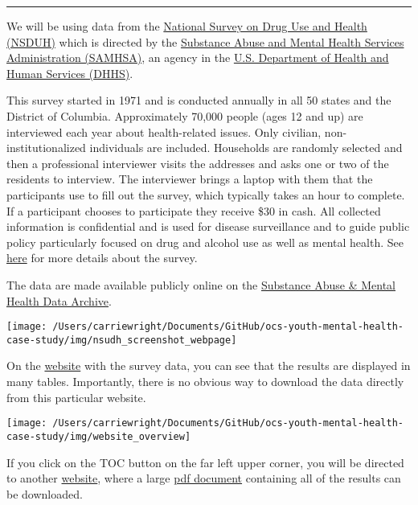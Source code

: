\documentclass[
]{article}
\begin{document}
\begin{center}\rule{0.5\linewidth}{0.5pt}\end{center}

We will be using data from the
\href{https://nsduhweb.rti.org/respweb/homepage.cfm}{National Survey on
Drug Use and Health (NSDUH)} which is directed by the
\href{https://www.samhsa.gov/}{Substance Abuse and Mental Health
Services Administration (SAMHSA)}, an agency in the
\href{https://www.hhs.gov/}{U.S. Department of Health and Human Services
(DHHS)}.

This survey started in 1971 and is conducted annually in all 50 states
and the District of Columbia. Approximately 70,000 people (ages 12 and
up) are interviewed each year about health-related issues. Only
civilian, non-institutionalized individuals are included. Households are
randomly selected and then a professional interviewer visits the
addresses and asks one or two of the residents to interview. The
interviewer brings a laptop with them that the participants use to fill
out the survey, which typically takes an hour to complete. If a
participant chooses to participate they receive \$30 in cash. All
collected information is confidential and is used for disease
surveillance and to guide public policy particularly focused on drug and
alcohol use as well as mental health. See
\href{https://nsduhweb.rti.org/respweb/about_nsduh.html}{here} for more
details about the survey.

The data are made available publicly online on the
\href{https://datafiles.samhsa.gov/}{Substance Abuse \& Mental Health
Data Archive}.

\begin{center}\texttt{[image: /Users/carriewright/Documents/GitHub/ocs-youth-mental-health-case-study/img/nsudh\_screenshot\_webpage]} \end{center}

On the
\href{https://www.samhsa.gov/data/sites/default/files/cbhsq-reports/NSDUHDetailedTabs2018R2/NSDUHDetTabsSect11pe2018.htm}{website}
with the survey data, you can see that the results are displayed in many
tables. Importantly, there is no obvious way to download the data
directly from this particular website.

\begin{center}\texttt{[image: /Users/carriewright/Documents/GitHub/ocs-youth-mental-health-case-study/img/website\_overview]} \end{center}

If you click on the TOC button on the far left upper corner, you will be
directed to another
\href{https://www.samhsa.gov/data/sites/default/files/cbhsq-reports/NSDUHDetailedTabs2018R2/NSDUHDetailedTabsTOC2018.htm\#toc}{website},
where a large
\href{https://www.samhsa.gov/data/sites/default/files/cbhsq-reports/NSDUHDetailedTabs2018R2/NSDUHDetailedTabs2018.pdf}{pdf
document} containing all of the results can be downloaded.
\end{document}

